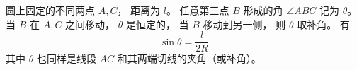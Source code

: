 
\begin{issues}
\issueDraft
\end{issues}

圆上固定的不同两点 $A,C$， 距离为 $l$。 任意第三点 $B$ 形成的角 $\angle ABC$ 记为 $\theta$。 当 $B$ 在 $A,C$ 之间移动， $\theta$ 是恒定的， 当 $B$ 移动到另一侧， 则 $\theta$ 取补角。 有
\begin{equation}\label{eq_SphTri_1}
\sin\theta = \frac{l}{2R}
\end{equation}
其中 $\theta$ 也同样是线段 $AC$ 和其两端切线的夹角（或补角）。
